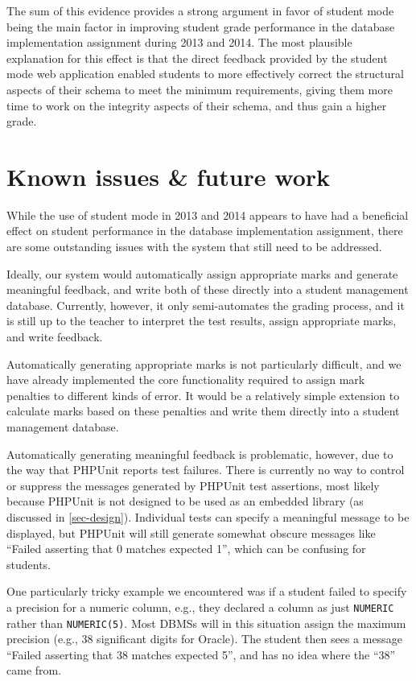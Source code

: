 \documentclass[sigconf, authordraft, capitalise]{acmart}
\begin{document}
The sum of this evidence provides a strong argument in favor of student mode being the main factor in improving student grade performance in the database implementation assignment during 2013 and 2014. The most plausible explanation for this effect is that the direct feedback provided by the student mode web application enabled students to more effectively correct the structural aspects of their schema to meet the minimum requirements, giving them more time to work on the integrity aspects of their schema, and thus gain a higher grade.


\section{Known issues \& future work}
\label{sec-issues}

While the use of student mode in 2013 and 2014 appears to have had a beneficial effect on student performance in the database implementation assignment, there are some outstanding issues with the system that still need to be addressed.

Ideally, our system would automatically assign appropriate marks and generate meaningful feedback, and write both of these directly into a student management database. Currently, however, it only semi-automates the grading process, and it is still up to the teacher to interpret the test results, assign appropriate marks, and write feedback.

Automatically generating appropriate marks is not particularly difficult, and we have already implemented the core functionality required to assign mark penalties to different kinds of error. It would be a relatively simple extension to calculate marks based on these penalties and write them directly into a student management database.

Automatically generating meaningful feedback is problematic, however, due to the way that PHPUnit reports test failures. There is currently no way to control or suppress the messages generated by PHPUnit test assertions, most likely because PHPUnit is not designed to be used as an embedded library (as discussed in \cref{sec-design}). Individual tests can specify a meaningful message to be displayed, but PHPUnit will still generate somewhat obscure messages like ``Failed asserting that 0 matches expected 1'', which can be confusing for students.

One particularly tricky example we encountered was if a student failed to specify a precision for a numeric column, e.g., they declared a column as just \texttt{NUMERIC} rather than \texttt{NUMERIC(5)}. Most DBMSs will in this situation assign the maximum precision (e.g., 38 significant digits for Oracle). The student then sees a message ``Failed asserting that 38 matches expected 5'', and has no idea where the ``38'' came from.
\end{document}
